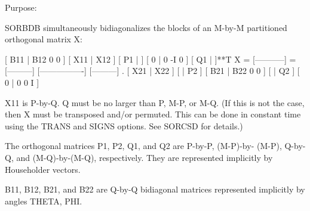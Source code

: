  \begin{DoxyParagraph}{Purpose\+: }
\begin{DoxyVerb} SORBDB simultaneously bidiagonalizes the blocks of an M-by-M
 partitioned orthogonal matrix X:

                                 [ B11 | B12 0  0 ]
     [ X11 | X12 ]   [ P1 |    ] [  0  |  0 -I  0 ] [ Q1 |    ]**T
 X = [-----------] = [---------] [----------------] [---------]   .
     [ X21 | X22 ]   [    | P2 ] [ B21 | B22 0  0 ] [    | Q2 ]
                                 [  0  |  0  0  I ]

 X11 is P-by-Q. Q must be no larger than P, M-P, or M-Q. (If this is
 not the case, then X must be transposed and/or permuted. This can be
 done in constant time using the TRANS and SIGNS options. See SORCSD
 for details.)

 The orthogonal matrices P1, P2, Q1, and Q2 are P-by-P, (M-P)-by-
 (M-P), Q-by-Q, and (M-Q)-by-(M-Q), respectively. They are
 represented implicitly by Householder vectors.

 B11, B12, B21, and B22 are Q-by-Q bidiagonal matrices represented
 implicitly by angles THETA, PHI.\end{DoxyVerb}
 
\end{DoxyParagraph}

